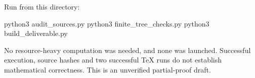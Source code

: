 \documentclass[
  11pt,
]{article}
\newenvironment{Shaded}{}{}
\newcommand{\ExtensionTok}[1]{#1}
\newcommand{\NormalTok}[1]{#1}
\begin{document}
Run from this directory:

\begin{Shaded}
\begin{Highlighting}[]
\ExtensionTok{python3}\NormalTok{ audit\_sources.py}
\ExtensionTok{python3}\NormalTok{ finite\_tree\_checks.py}
\ExtensionTok{python3}\NormalTok{ build\_deliverable.py}
\end{Highlighting}
\end{Shaded}

No resource-heavy computation was needed, and none was launched.
Successful execution, source hashes and two successful TeX runs do not
establish mathematical correctness. This is an unverified partial-proof
draft.
\end{document}
